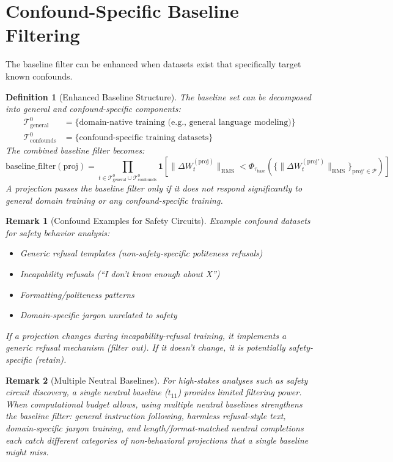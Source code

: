\documentclass[11pt]{article}
\newtheorem{definition}{Definition}[section]
\newtheorem{remark}{Remark}[section]
\begin{document}
\section{Confound-Specific Baseline Filtering}
\label{app:confound-filtering}

The baseline filter can be enhanced when datasets exist that specifically target known confounds.

\begin{definition}[Enhanced Baseline Structure]
The baseline set can be decomposed into general and confound-specific components:
\begin{align}
\mathcal{T}^0_{\text{general}} &= \{\text{domain-native training (e.g., general language modeling)}\} \\
\mathcal{T}^0_{\text{confounds}} &= \{\text{confound-specific training datasets}\}
\end{align}
The combined baseline filter becomes:
\begin{equation}
\text{baseline\_filter}(\text{proj}) = \prod_{t \in \mathcal{T}^0_{\text{general}} \cup \mathcal{T}^0_{\text{confounds}}} \mathbf{1}\left[\|\Delta W^{(\text{proj})}_t\|_{\text{RMS}} < \Phi_{\tau_{\text{base}}}(\{\|\Delta W^{(\text{proj}')}_t\|_{\text{RMS}}\}_{\text{proj}' \in \mathcal{P}})\right]
\end{equation}
A projection passes the baseline filter only if it does not respond significantly to general domain training or any confound-specific training.
\end{definition}

\begin{remark}[Confound Examples for Safety Circuits]
Example confound datasets for safety behavior analysis:
\begin{itemize}[nosep]
\item Generic refusal templates (non-safety-specific politeness refusals)
\item Incapability refusals (``I don't know enough about X'')
\item Formatting/politeness patterns
\item Domain-specific jargon unrelated to safety
\end{itemize}
If a projection changes during incapability-refusal training, it implements a generic refusal mechanism (filter out). If it doesn't change, it is potentially safety-specific (retain).
\end{remark}

\begin{remark}[Multiple Neutral Baselines]
For high-stakes analyses such as safety circuit discovery, a single neutral baseline ($t_{11}$) provides limited filtering power. When computational budget allows, using multiple neutral baselines strengthens the baseline filter: general instruction following, harmless refusal-style text, domain-specific jargon training, and length/format-matched neutral completions each catch different categories of non-behavioral projections that a single baseline might miss.
\end{remark}
\end{document}
